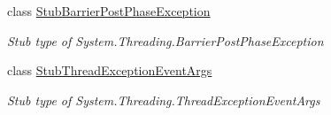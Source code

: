 \begin{DoxyCompactItemize}
class \hyperlink{class_system_1_1_threading_1_1_fakes_1_1_stub_barrier_post_phase_exception}{Stub\-Barrier\-Post\-Phase\-Exception}
\begin{DoxyCompactList}\small\item\em Stub type of System.\-Threading.\-Barrier\-Post\-Phase\-Exception\end{DoxyCompactList}\item 
class \hyperlink{class_system_1_1_threading_1_1_fakes_1_1_stub_thread_exception_event_args}{Stub\-Thread\-Exception\-Event\-Args}
\begin{DoxyCompactList}\small\item\em Stub type of System.\-Threading.\-Thread\-Exception\-Event\-Args\end{DoxyCompactList}\end{DoxyCompactItemize}

